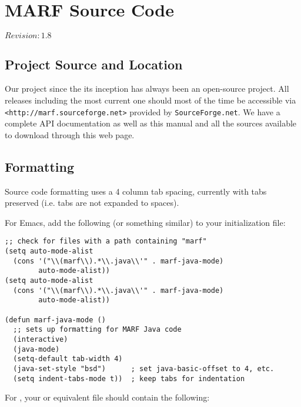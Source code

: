 \section{MARF Source Code}

$Revision: 1.8 $

\subsection{Project Source and Location}

Our project since the its inception has always been an open-source project.
All releases including the most current one should most of the time be
accessible via \verb+<http://marf.sourceforge.net>+ provided by \texttt{SourceForge.net}.
We have a complete API documentation as well as this manual and all the sources
available to download through this web page.

\subsection{Formatting}

Source code formatting uses a 4 column tab spacing, currently with
tabs preserved (i.e. tabs are not expanded to spaces).

For Emacs, add the following (or something similar)
to your 
initialization file:

\begin{verbatim}
;; check for files with a path containing "marf"
(setq auto-mode-alist
  (cons '("\\(marf\\).*\\.java\\'" . marf-java-mode)
        auto-mode-alist))
(setq auto-mode-alist
  (cons '("\\(marf\\).*\\.java\\'" . marf-java-mode)
        auto-mode-alist))

(defun marf-java-mode ()
  ;; sets up formatting for MARF Java code
  (interactive)
  (java-mode)
  (setq-default tab-width 4)
  (java-set-style "bsd")      ; set java-basic-offset to 4, etc.
  (setq indent-tabs-mode t))  ; keep tabs for indentation
\end{verbatim}

For , your
 or equivalent file should contain
the following:


